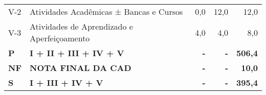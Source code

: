 \documentclass[11pt,a4paper]{article}
\begin{document}
\begin{table}[ht]
{\begin{tabular}{ll|r|r|r}
  V-2 & Atividades Acadêmicas ± Bancas e Cursos & 0,0 & 12,0 & 12,0 \\ 
  V-3 & Atividades de Aprendizado e Aperfeiçoamento & 4,0 & 4,0 & 8,0 \\ 
  \textbf{P} & \textbf{I + II + III + IV + V} & \textbf{-} & \textbf{-} & \textbf{506,4} \\ 
  \textbf{NF} & \textbf{NOTA FINAL DA CAD} & \textbf{-} & \textbf{-} & \textbf{10,0} \\ 
  \textbf{S} & \textbf{I + III + IV + V} & \textbf{-} & \textbf{-} & \textbf{395,4} \\ 
   \hline
\end{tabular}
}
\end{table}
\end{document}
